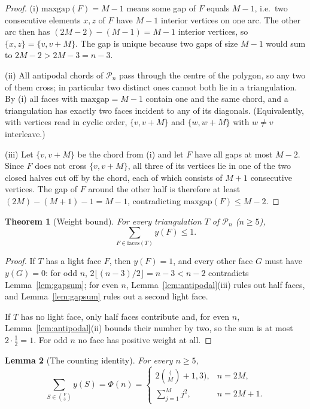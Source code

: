 \documentclass[11pt,a4paper]{article}
\newtheorem{theorem}{Theorem}[section]
\newtheorem{lemma}[theorem]{Lemma}
\theoremstyle{definition}
\newcommand{\Pol}{\mathcal{P}}
\newcommand{\maxgap}{\mathrm{maxgap}}
\begin{document}
\begin{proof}
(i) $\maxgap(F) = M-1$ means some gap of $F$ equals $M-1$, i.e.\ two consecutive
elements $x, z$ of $F$ have $M-1$ interior vertices on one arc. The other arc
then has $(2M-2)-(M-1) = M-1$ interior vertices, so $\{x,z\} = \{v, v+M\}$. The
gap is unique because two gaps of size $M-1$ would sum to $2M-2 > 2M-3 = n-3$.

(ii) All antipodal chords of $\Pol_n$ pass through the centre of the polygon, so
any two of them cross; in particular two distinct ones cannot both lie in a
triangulation. By (i) all faces with $\maxgap = M-1$ contain one and the same
chord, and a triangulation has exactly two faces incident to any of its
diagonals. (Equivalently, with vertices read in cyclic order, $\{v,v+M\}$ and
$\{w,w+M\}$ with $w \ne v$ interleave.)

(iii) Let $\{v, v+M\}$ be the chord from (i) and let $F$ have all gaps at most
$M-2$. Since $F$ does not cross $\{v, v+M\}$, all three of its vertices lie in one
of the two closed halves cut off by the chord, each of which consists of $M+1$
consecutive vertices. The gap of $F$ around the other half is therefore at least
$(2M) - (M+1) - 1 = M-1$, contradicting $\maxgap(F) \le M-2$.
\end{proof}

\begin{theorem}[Weight bound]\label{thm:weightbound}
For every triangulation $T$ of $\Pol_n$ ($n \ge 5$),
\[
\sum_{F \in \mathrm{faces}(T)} y(F) \le 1 .
\]
\end{theorem}

\begin{proof}
If $T$ has a light face $F$, then $y(F) = 1$, and every other face $G$ must have
$y(G) = 0$: for odd $n$, $2 \lfloor (n-3)/2 \rfloor = n-3 < n-2$ contradicts
Lemma~\ref{lem:gapsum}; for even $n$, Lemma~\ref{lem:antipodal}(iii) rules out
half faces, and Lemma~\ref{lem:gapsum} rules out a second light face.

If $T$ has no light face, only half faces contribute and, for even $n$,
Lemma~\ref{lem:antipodal}(ii) bounds their number by two, so the sum is at most
$2 \cdot \tfrac12 = 1$. For odd $n$ no face has positive weight at all.
\end{proof}

\begin{lemma}[The counting identity]\label{lem:counting}
For every $n \ge 5$,
\[
\sum_{S \in \binom{V}{3}} y(S) = \Phi(n) =
\begin{cases}
  2\binom(M+1,3), & n = 2M,\\[2pt]
  \displaystyle\sum_{j=1}^{M} j^{2}, & n = 2M+1.
\end{cases}
\]
\end{lemma}
\end{document}
